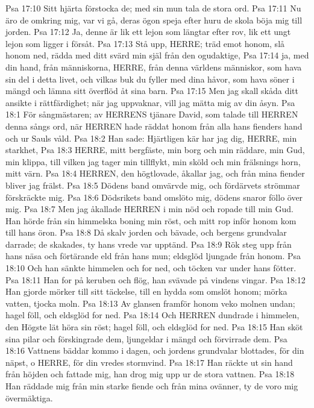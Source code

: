 Psa 17:10  Sitt hjärta förstocka de; med sin mun tala de stora ord.
Psa 17:11  Nu äro de omkring mig, var vi gå, deras ögon speja efter huru de skola böja mig till jorden.
Psa 17:12  Ja, denne är lik ett lejon som längtar efter rov, lik ett ungt lejon som ligger i försåt.
Psa 17:13  Stå upp, HERRE; träd emot honom, slå honom ned, rädda med ditt svärd min själ från den ogudaktige,
Psa 17:14  ja, med din hand, från människorna, HERRE, från denna världens människor, som hava sin del i detta livet, och vilkas buk du fyller med dina håvor, som hava söner i mängd och lämna sitt överflöd åt sina barn.
Psa 17:15  Men jag skall skåda ditt ansikte i rättfärdighet; när jag uppvaknar, vill jag mätta mig av din åsyn.
Psa 18:1  För sångmästaren; av HERRENS tjänare David, som talade till HERREN denna sångs ord, när HERREN hade räddat honom från alla hans fienders hand och ur Sauls våld.
Psa 18:2  Han sade: Hjärtligen kär har jag dig, HERRE, min starkhet,
Psa 18:3  HERRE, mitt bergfäste, min borg och min räddare, min Gud, min klippa, till vilken jag tager min tillflykt, min sköld och min frälsnings horn, mitt värn.
Psa 18:4  HERREN, den högtlovade, åkallar jag, och från mina fiender bliver jag frälst.
Psa 18:5  Dödens band omvärvde mig, och fördärvets strömmar förskräckte mig.
Psa 18:6  Dödsrikets band omslöto mig, dödens snaror föllo över mig.
Psa 18:7  Men jag åkallade HERREN i min nöd och ropade till min Gud. Han hörde från sin himmelska boning min röst, och mitt rop inför honom kom till hans öron.
Psa 18:8  Då skalv jorden och bävade, och bergens grundvalar darrade; de skakades, ty hans vrede var upptänd.
Psa 18:9  Rök steg upp från hans näsa och förtärande eld från hans mun; eldsglöd ljungade från honom.
Psa 18:10  Och han sänkte himmelen och for ned, och töcken var under hans fötter.
Psa 18:11  Han for på keruben och flög, han svävade på vindens vingar.
Psa 18:12  Han gjorde mörker till sitt täckelse, till en hydda som omslöt honom; mörka vatten, tjocka moln.
Psa 18:13  Av glansen framför honom veko molnen undan; hagel föll, och eldsglöd for ned.
Psa 18:14  Och HERREN dundrade i himmelen, den Högste lät höra sin röst; hagel föll, och eldsglöd for ned.
Psa 18:15  Han sköt sina pilar och förskingrade dem, ljungeldar i mängd och förvirrade dem.
Psa 18:16  Vattnens bäddar kommo i dagen, och jordens grundvalar blottades, för din näpst, o HERRE, för din vredes stormvind.
Psa 18:17  Han räckte ut sin hand från höjden och fattade mig, han drog mig upp ur de stora vattnen.
Psa 18:18  Han räddade mig från min starke fiende och från mina ovänner, ty de voro mig övermäktiga.
